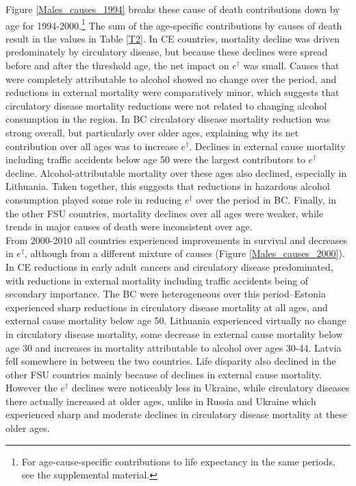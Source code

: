 \documentclass{article}
\begin{document}
\begin{spacing}{1.5}
Figure \ref{Males_causes_1994} breaks these cause of death contributions down by age for 1994-2000.\footnote{For age-cause-specific contributions to life expectancy in the same periods, see the supplemental material.} The sum of the age-specific contributions by causes of death result in the values in Table \ref{T2}. In CE countries, mortality decline was driven predominately by circulatory disease, but because these declines were spread before and after the threshold age, the net impact on $e^\dagger$ was small. Causes that were completely attributable to alcohol showed no change over the period, and reductions in external mortality were comparatively minor, which suggests that circulatory disease mortality reductions were not related to changing alcohol consumption in the region. In BC circulatory disease mortality reduction was strong overall, but particularly over older ages, explaining why its net contribution over all ages was to increase $e^\dagger$. Declines in external cause mortality including traffic accidents below age 50 were the largest contributors to $e^\dagger$ decline. Alcohol-attributable mortality over these ages also declined, especially in Lithuania. Taken together, this suggests that reductions in hazardous alcohol consumption played some role in reducing $e^\dagger$ over the period in BC. Finally, in the other FSU countries, mortality declines over all ages were weaker, while trends in major causes of death were inconsistent over age. \\

From 2000-2010 all countries experienced improvements in survival and decreases in $e^\dagger$, although from a different mixture of causes (Figure \ref{Males_causes_2000}). In CE  reductions in early adult cancers and circulatory disease predominated, with reductions in external mortality including traffic accidents being of secondary importance. The BC were heterogeneous over this period--Estonia experienced sharp reductions in circulatory disease mortality at all ages, and external cause mortality below age 50. Lithuania experienced virtually no change in circulatory disease mortality, some decrease in external cause mortality below age 30 and increases in mortality attributable to alcohol over ages 30-44. Latvia fell somewhere in between the two countries. Life disparity also declined in the other FSU countries mainly because of declines in external cause mortality. However the $e^\dagger$ declines were noticeably less in Ukraine, while circulatory diseases there actually increased at older ages, unlike in Russia and Ukraine which experienced sharp and moderate declines in circulatory disease mortality at these older ages.\\




\end{spacing}
\end{document}
